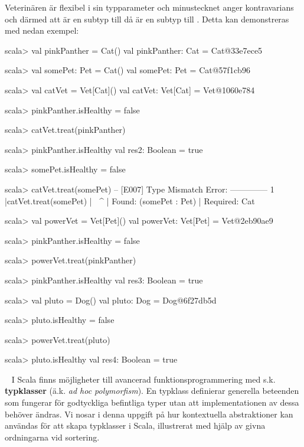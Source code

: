 \SubtaskSolved Veterinären  är flexibel i sin typparameter och minustecknet anger kontravarians och därmed att  är en subtyp till  då  är en subtyp till . Detta kan demonstreras med nedan exempel:
\begin{REPL}
scala> val pinkPanther = Cat()
val pinkPanther: Cat = Cat@33e7ece5

scala> val somePet: Pet = Cat()
val somePet: Pet = Cat@57f1cb96

scala> val catVet = Vet[Cat]()
val catVet: Vet[Cat] = Vet@1060e784

scala> pinkPanther.isHealthy = false

scala> catVet.treat(pinkPanther)

scala> pinkPanther.isHealthy
val res2: Boolean = true

scala> somePet.isHealthy = false

scala> catVet.treat(somePet)
-- [E007] Type Mismatch Error: --------------
1 |catVet.treat(somePet)
  |             ^^^^^^^
  |             Found:    (somePet : Pet)
  |             Required: Cat

scala> val powerVet = Vet[Pet]()
val powerVet: Vet[Pet] = Vet@2eb90ae9

scala> pinkPanther.isHealthy = false

scala> powerVet.treat(pinkPanther)

scala> pinkPanther.isHealthy
val res3: Boolean = true

scala> val pluto = Dog()
val pluto: Dog = Dog@6f27db5d

scala> pluto.isHealthy = false

scala> powerVet.treat(pluto)

scala> pluto.isHealthy
val res4: Boolean = true

\end{REPL}


\QUESTEND





\QUESTBEGIN

\Task  \what~  I Scala finns möjligheter till avancerad funktionsprogrammering med s.k. \textbf{typklasser} (ä.k. \emph{ad hoc polymorfism}). En typklass definierar generella beteenden som fungerar för godtyckliga befintliga typer utan att implementationen av dessa behöver ändras. Vi nosar i denna uppgift på hur kontextuella abstraktioner kan användas för att skapa typklasser i Scala, illustrerat med hjälp av givna ordningarna vid sortering.

